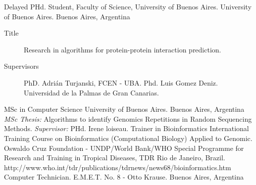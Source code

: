 \documentclass[9pt,a4paper,sans]{moderncv}
\newcommand{\FCEN}{Faculty of Science}
\newcommand{\UBA}{University of Buenos Aires}
\newcommand{\CS}{MSc in Computer Science}
\begin{document}
	{Delayed PHd. Student, \FCEN, \UBA.}
	{\UBA.}
	{Buenos Aires, Argentina}
	{}
	{\begin{description}
	\item [Title] Research in algorithms for protein-protein interaction prediction.
	\item [Supervisors] PhD. Adrián Turjanski, FCEN - UBA. Phd. Luis Gomez Deniz. Universidad de la Palmas de Gran Canarias.
	\end{description}}
	{\CS}
	{\UBA.}
	{Buenos Aires, Argentina}
	{}
	{\emph{MSc Thesis:} Algorithms to identify Genomics Repetitions in Random Sequencing Methods. \emph{Supervisor:} PHd. Irene loiseau.}
	{Trainer in Bioinformatics}
	{International Training Course on Bioinformatics (Computational Biology) Applied to Genomic. Oswaldo Cruz Foundation - UNDP/World Bank/WHO Special Programme for Research and Training in Tropical Diseases, TDR}
	{Rio de Janeiro, Brazil.}
	{}
	{http://www.who.int/tdr/publications/tdrnews/news68/bioinformatics.htm}
	{Computer Technician.}
	{E.M.E.T. No. 8 - Otto Krause.}
	{Buenos Aires, Argentina}
	{}
	{}
\end{document}

